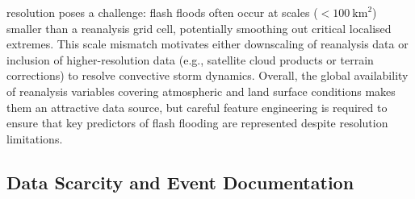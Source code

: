 resolution poses a challenge: flash floods often occur at scales ($<100~\text{km}^2$) smaller than a reanalysis grid cell, potentially smoothing out critical localised extremes. This scale mismatch motivates either downscaling of reanalysis data or inclusion of higher-resolution data (e.g., satellite cloud products or terrain corrections) to resolve convective storm dynamics. Overall, the global availability of reanalysis variables covering atmospheric and land surface conditions makes them an attractive data source, but careful feature engineering is required to ensure that key predictors of flash flooding are represented despite resolution limitations.

\subsection{Data Scarcity and Event Documentation} 
